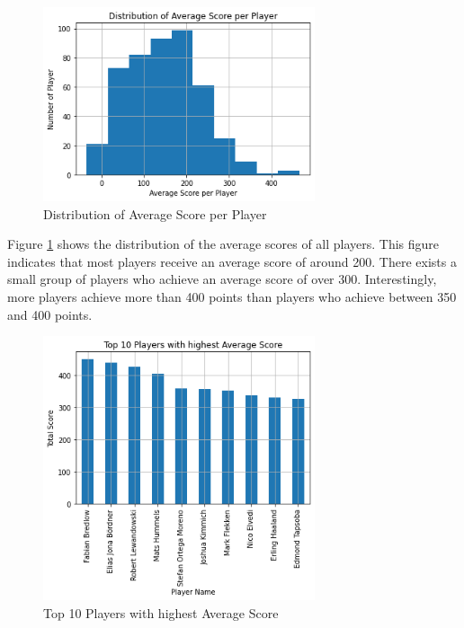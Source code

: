 \begin{figure}[H]
    \centering
    \includegraphics[width=8cm]{chapter/4_implementation/section/2_data/section/figures/distribution_of_average_score_per_player.png}
    \captionsetup{justification=centering}
    \caption{Distribution of Average Score per Player}
    \label{fig:distribution_of_average_score_per_player}
\end{figure}

Figure \ref{fig:distribution_of_average_score_per_player} shows the distribution of the average scores of all players. This figure indicates that most players receive an average score of around 200. There exists a small group of players who achieve an average score of over 300. Interestingly, more players achieve more than 400 points than players who achieve between 350 and 400 points.

\begin{figure}[H]
    \centering
    \includegraphics[width=8cm]{chapter/4_implementation/section/2_data/section/figures/top_10_player_average_score.png}
    \captionsetup{justification=centering}
    \caption{Top 10 Players with highest Average Score}
    \label{fig:top_10_player_average_score}
\end{figure}


